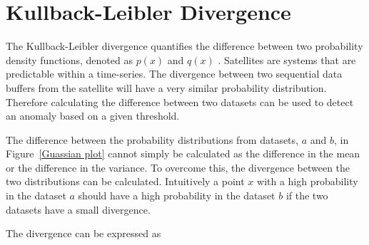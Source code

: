 \section{Kullback-Leibler Divergence}
The Kullback-Leibler divergence quantifies the difference between two probability density functions, denoted as $p(x)$ and $q(x)$ \cite{hershey2007approximating}. Satellites are systems that are predictable within a time-series. The divergence between two sequential data buffers from the satellite will have a very similar probability distribution. Therefore calculating the difference between two datasets can be used to detect an anomaly based on a given threshold.

The difference between the probability distributions from datasets, $a$ and $b$, in Figure~\ref{Guassian plot} cannot simply be calculated as the difference in the mean or the difference in the variance. To overcome this, the divergence between the two distributions can be calculated. Intuitively a point $x$ with a high probability in the dataset $a$ should have a high probability in the dataset $b$ if the two datasets have a small divergence. 


%			
%			
%			
%			
%			
%			
%		

The divergence can be expressed as 

